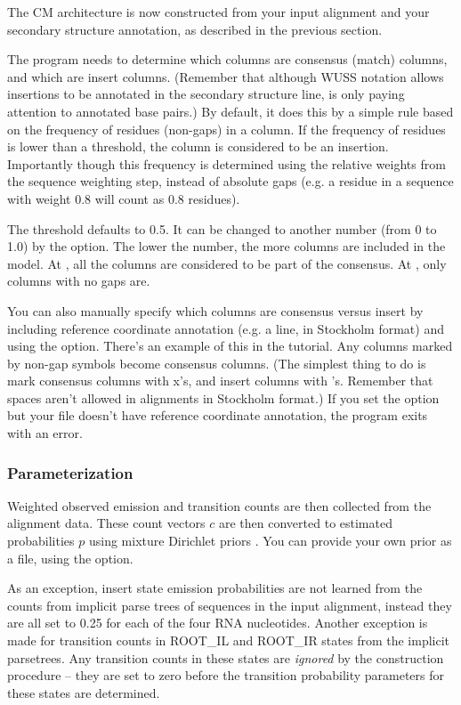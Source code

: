 The CM architecture is now constructed from your input alignment and
your secondary structure annotation, as described in the previous
section. 

The program needs to determine which columns are consensus (match)
columns, and which are insert columns. (Remember that although WUSS
notation allows insertions to be annotated in the secondary structure
line,  is only paying attention to annotated base
pairs.) By default, it does this by a simple rule based on the
frequency of residues (non-gaps) in a column. If the frequency of
residues is lower than a threshold, the column is considered to be
an insertion. Importantly though this frequency is determined using
the relative weights from the sequence weighting step, instead of
absolute gaps (e.g. a residue in a sequence with weight $0.8$ will count
 as $0.8$ residues).

The threshold defaults to 0.5. It can be changed to another number
 (from 0 to 1.0) by the  option.  The
lower the number, the more columns are included in the model.  At
, all the columns are considered to be part of
the consensus. At , only columns with no gaps are.

You can also manually specify which columns are consensus versus
insert by including reference coordinate annotation (e.g. a
 line, in Stockholm format) and using the
 option. There's an example of this in the tutorial. Any
columns marked by non-gap symbols become consensus columns. (The
simplest thing to do is mark consensus columns with x's, and insert
columns with 's. Remember that spaces aren't allowed in
alignments in Stockholm format.) If you set the  option but
your file doesn't have reference coordinate annotation, the program
exits with an error.

\subsubsection{Parameterization}

Weighted observed emission and transition counts are then collected
from the alignment data. These count vectors $c$ are then converted to
estimated probabilities $p$ using mixture Dirichlet priors
\citep{Sjolander96, Durbin98, NawrockiEddy07}. You can provide your
own prior as a file, using the  option.

As an exception, insert state emission probabilities are not learned
from the counts from implicit parse trees of sequences in the input
alignment, instead they are all set to 0.25 for each of the four RNA
nucleotides.  Another exception is made for transition counts in
ROOT\_IL and ROOT\_IR states from the implicit parsetrees. Any
transition counts in these states are \emph{ignored} by the
construction procedure -- they are set to zero before the transition
probability parameters for these states are determined.

